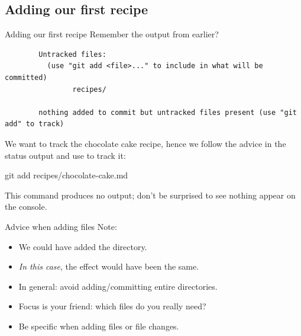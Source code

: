 \documentclass{git_course}
\begin{document}
\subsection{Adding our first recipe}

\begin{frame}[fragile]{Adding our first recipe}
    Remember the  output from earlier?
    \begin{verbatim}
        Untracked files:
          (use "git add <file>..." to include in what will be committed)
                recipes/

        nothing added to commit but untracked files present (use "git add" to track)
    \end{verbatim}

    We want to track the chocolate cake recipe, hence we follow the advice
    in the status output and use  to track it:
    \begin{shellcode}
        git add recipes/chocolate-cake.md
    \end{shellcode}
    This command produces no output; don't be surprised to see nothing
    appear on the console.
\end{frame}

\begin{frame}[fragile]{Advice when adding files}
    Note:
    \begin{itemize}
        \item We could have added the  directory.
        \item \emph{In this case}, the effect would have been the same.
        \item In general: avoid adding/committing entire directories.
        \item Focus is your friend: which files do you really need?
        \item Be specific when adding files or file changes.
    \end{itemize}
\end{frame}
\end{document}
